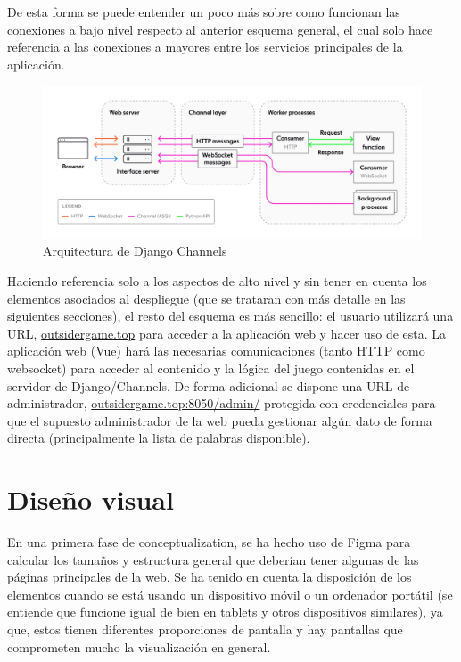 De esta forma se puede entender un poco más sobre como funcionan las 
conexiones a bajo nivel respecto al anterior esquema general, el cual solo hace referencia a las conexiones 
a mayores entre los servicios principales de la aplicación.

\begin{figure}[h]
	\centering
	\includegraphics[width=\textwidth,clip=true]{res_esquemaDjangoChannels.jpg}
	\caption{Arquitectura de Django Channels}
	\label{fig:res_esquemaDjangoChannels}
\end{figure}

Haciendo referencia solo a los aspectos de alto nivel y sin tener en cuenta los elementos asociados al despliegue (que se trataran con más detalle en las siguientes secciones), 
el resto del esquema es más sencillo: el usuario utilizará una URL, \href{http://outsidergame.top/}{outsidergame.top}  para acceder a la aplicación web y hacer uso de esta. La aplicación web (Vue) hará las necesarias comunicaciones (tanto HTTP como websocket) 
para acceder al contenido y la lógica del juego contenidas en el servidor de Django/Channels. De forma adicional se dispone una URL de administrador, 
\href{http://outsidergame.top:8050/admin/}{outsidergame.top:8050/admin/} protegida con credenciales para que el supuesto administrador de la web 
pueda gestionar algún dato de forma directa (principalmente la lista de palabras disponible).

\section{Diseño visual}

En una primera fase de conceptualization, se ha hecho uso de Figma \cite{figma} para calcular los tamaños y 
estructura general que deberían tener algunas de las páginas principales de la web. Se ha tenido en cuenta la disposición de los elementos cuando 
se está usando un dispositivo móvil o un ordenador portátil (se entiende que funcione igual de bien en tablets y otros dispositivos similares), ya que, 
estos tienen diferentes proporciones de pantalla y hay pantallas que comprometen mucho la visualización en general.

